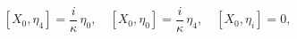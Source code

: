 \begin{equation}\label{12}
  [X_0,\eta_4] = \frac{i}\kappa\, \eta_0, \quad [X_0,\eta_0] = \frac{i}\kappa\, \eta_4, \quad [X_0,\eta_i] = 0,
\end{equation}

